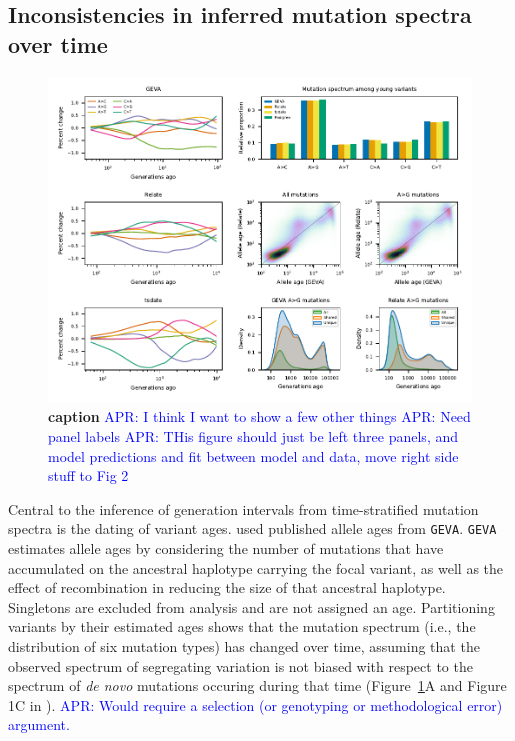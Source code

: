 \documentclass[]{article}
\newcommand{\aprcomment}[1]{{\textcolor{blue}{APR: #1}}}
\newcommand{\GEVA}{\texttt{GEVA}\xspace}
\begin{document}
\subsection*{Inconsistencies in inferred mutation spectra over time}

\begin{figure}[t!]
    \centering
    \includegraphics{../plots/fig1.pdf}
    \caption{
        \textbf{caption}
        \aprcomment{I think I want to show a few other things}
        \aprcomment{Need panel labels}
        \aprcomment{THis figure should just be left three panels, and model
            predictions and fit between model and data, move right side
        stuff to Fig 2}
    }
    \label{fig:spectrum-ages}
\end{figure}

Central to the inference of generation intervals from time-stratified mutation
spectra is the dating of variant ages. \citet{wang2023human} used published
allele ages from \GEVA \citep{albers2020dating}. \GEVA estimates allele ages by
considering the number of mutations that have accumulated on the ancestral
haplotype carrying the focal variant, as well as the effect of recombination in
reducing the size of that ancestral haplotype. Singletons are excluded from
analysis and are not assigned an age. Partitioning variants by their estimated
ages shows that the mutation spectrum (i.e., the distribution of six mutation
types) has changed over time, assuming that the observed spectrum of
segregating variation is not biased with respect to the spectrum of \emph{de
novo} mutations occuring during that time (Figure~\ref{fig:spectrum-ages}A and
Figure 1C in \citet{wang2023human}). \aprcomment{Would require a selection (or
genotyping or methodological error) argument.}
\end{document}

